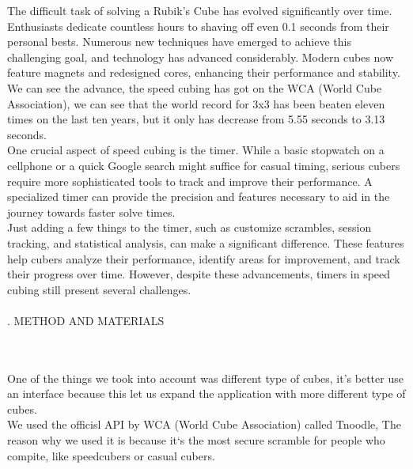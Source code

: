 \documentclass[conference]{IEEEtran}
\begin{document}
The difficult task of solving a Rubik’s Cube has evolved significantly over time. Enthusiasts dedicate countless hours to shaving off even 0.1 seconds from their personal bests. Numerous new techniques have emerged to achieve this challenging goal, and technology has advanced considerably. Modern cubes now feature magnets and redesigned cores, enhancing their performance and stability.
\\
\indent We can see the advance, the speed cubing has got on the WCA (World Cube Association), we can see that the world record for 3x3 has been beaten eleven times on the last ten years, but it only has decrease from 5.55 seconds to 3.13 seconds.
\\
\indent One crucial aspect of speed cubing is the timer. While a basic stopwatch on a cellphone or a quick Google search might suffice for casual timing, serious cubers require more sophisticated tools to track and improve their performance. A specialized timer can provide the precision and features necessary to aid in the journey towards faster solve times.
\\
\indent Just adding a few things to the timer, such as customize scrambles, session tracking, and statistical analysis, can make a significant difference. These features help cubers analyze their performance, identify areas for improvement, and track their progress over time. However, despite these advancements, timers in speed cubing still present several challenges.
\\\\
. {METHOD AND MATERIALS}

\\\\
\indent One of the things we took into account was different type of cubes, it's better use an interface because this let us expand the application with more different type of cubes. 
\\
\indent We used the officisl API by WCA (World Cube Association) called Tnoodle, The reason why we used it is because it`s the most secure scramble for people who compite, like speedcubers or casual cubers.
\end{document}
